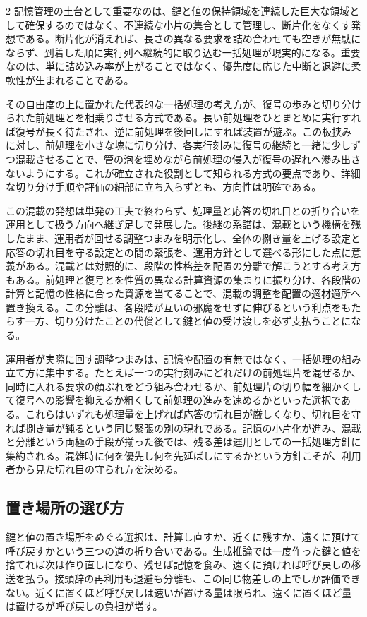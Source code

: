 \documentclass[lualatex,a4paper,10pt]{jlreq}
\begin{document}
\begin{multicols}{2}
記憶管理の土台として重要なのは、鍵と値の保持領域を連続した巨大な領域として確保するのではなく、不連続な小片の集合として管理し、断片化をなくす発想である\autocite{pagedattn}。断片化が消えれば、長さの異なる要求を詰め合わせても空きが無駄にならず、到着した順に実行列へ継続的に取り込む一括処理が現実的になる。重要なのは、単に詰め込み率が上がることではなく、優先度に応じた中断と退避に柔軟性が生まれることである。

その自由度の上に置かれた代表的な一括処理の考え方が、復号の歩みと切り分けられた前処理とを相乗りさせる方式である。長い前処理をひとまとめに実行すれば復号が長く待たされ、逆に前処理を後回しにすれば装置が遊ぶ。この板挟みに対し、前処理を小さな塊に切り分け、各実行刻みに復号の継続と一緒に少しずつ混載させることで、管の泡を埋めながら前処理の侵入が復号の遅れへ滲み出さないようにする。これが確立された役割として知られる方式の要点であり、詳細な切り分け手順や評価の細部に立ち入らずとも、方向性は明確である\autocite{sarathi}。

この混載の発想は単発の工夫で終わらず、処理量と応答の切れ目との折り合いを運用として扱う方向へ継ぎ足しで発展した。後継の系譜は、混載という機構を残したまま、運用者が回せる調整つまみを明示化し、全体の捌き量を上げる設定と応答の切れ目を守る設定との間の緊張を、運用方針として選べる形にした点に意義がある\autocite{sarathi}。混載とは対照的に、段階の性格差を配置の分離で解こうとする考え方もある。前処理と復号とを性質の異なる計算資源の集まりに振り分け、各段階の計算と記憶の性格に合った資源を当てることで、混載の調整を配置の適材適所へ置き換える。この分離は、各段階が互いの邪魔をせずに伸びるという利点をもたらす一方、切り分けたことの代償として鍵と値の受け渡しを必ず支払うことになる\autocite{splitwise}。

運用者が実際に回す調整つまみは、記憶や配置の有無ではなく、一括処理の組み立て方に集中する。たとえば一つの実行刻みにどれだけの前処理片を混ぜるか、同時に入れる要求の顔ぶれをどう組み合わせるか、前処理片の切り幅を細かくして復号への影響を抑えるか粗くして前処理の進みを速めるかといった選択である。これらはいずれも処理量を上げれば応答の切れ目が厳しくなり、切れ目を守れば捌き量が鈍るという同じ緊張の別の現れである\autocite{sarathi}\autocite{pagedattn}\autocite{splitwise}。記憶の小片化が進み、混載と分離という両極の手段が揃った後では、残る差は運用としての一括処理方針に集約される。混雑時に何を優先し何を先延ばしにするかという方針こそが、利用者から見た切れ目の守られ方を決める。

\subsection{置き場所の選び方}
鍵と値の置き場所をめぐる選択は、計算し直すか、近くに残すか、遠くに預けて呼び戻すかという三つの道の折り合いである。生成推論では一度作った鍵と値を捨てれば次は作り直しになり、残せば記憶を食み、遠くに預ければ呼び戻しの移送を払う。接頭辞の再利用も退避も分離も、この同じ物差しの上でしか評価できない。近くに置くほど呼び戻しは速いが置ける量は限られ、遠くに置くほど量は置けるが呼び戻しの負担が増す\autocite{lmcache}\autocite{vllmprefix}\autocite{mooncake}。


\end{multicols}
\end{document}
